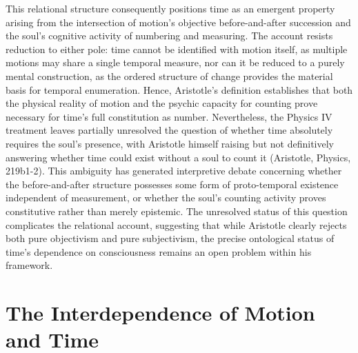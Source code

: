 \documentclass[12pt,a4paper]{article}
\begin{document}
This relational structure consequently positions time as an emergent property arising from the intersection of motion's objective before-and-after succession and the soul's cognitive activity of numbering and measuring. The account resists reduction to either pole: time cannot be identified with motion itself, as multiple motions may share a single temporal measure, nor can it be reduced to a purely mental construction, as the ordered structure of change provides the material basis for temporal enumeration. Hence, Aristotle's definition establishes that both the physical reality of motion and the psychic capacity for counting prove necessary for time's full constitution as number. Nevertheless, the Physics IV treatment leaves partially unresolved the question of whether time absolutely requires the soul's presence, with Aristotle himself raising but not definitively answering whether time could exist without a soul to count it (Aristotle, Physics, 219b1-2). This ambiguity has generated interpretive debate concerning whether the before-and-after structure possesses some form of proto-temporal existence independent of measurement, or whether the soul's counting activity proves constitutive rather than merely epistemic. The unresolved status of this question complicates the relational account, suggesting that while Aristotle clearly rejects both pure objectivism and pure subjectivism, the precise ontological status of time's dependence on consciousness remains an open problem within his framework.


\section{The Interdependence of Motion and Time}
\end{document}
